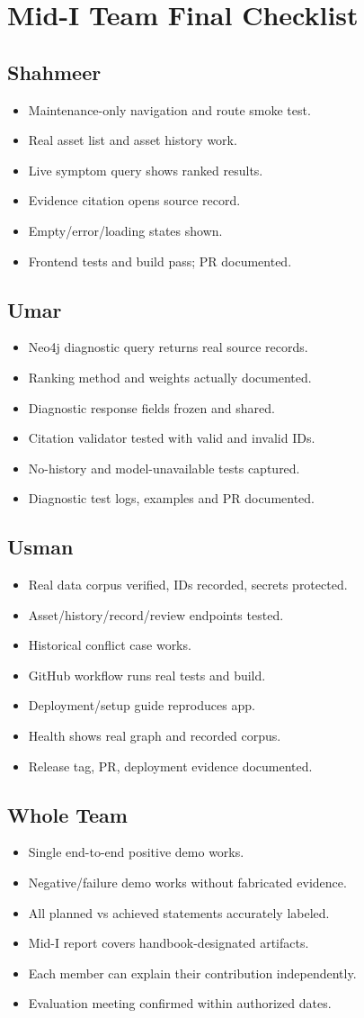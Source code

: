 \documentclass[11pt,a4paper,oneside]{report}
\newcommand{\task}[1]{\item[$\square$] #1}
\begin{document}
\appendix
\chapter{Mid-I Team Final Checklist}
\section{Shahmeer}
\begin{itemize}
\task{Maintenance-only navigation and route smoke test.}
\task{Real asset list and asset history work.}
\task{Live symptom query shows ranked results.}
\task{Evidence citation opens source record.}
\task{Empty/error/loading states shown.}
\task{Frontend tests and build pass; PR documented.}
\end{itemize}
\section{Umar}
\begin{itemize}
\task{Neo4j diagnostic query returns real source records.}
\task{Ranking method and weights actually documented.}
\task{Diagnostic response fields frozen and shared.}
\task{Citation validator tested with valid and invalid IDs.}
\task{No-history and model-unavailable tests captured.}
\task{Diagnostic test logs, examples and PR documented.}
\end{itemize}
\section{Usman}
\begin{itemize}
\task{Real data corpus verified, IDs recorded, secrets protected.}
\task{Asset/history/record/review endpoints tested.}
\task{Historical conflict case works.}
\task{GitHub workflow runs real tests and build.}
\task{Deployment/setup guide reproduces app.}
\task{Health shows real graph and recorded corpus.}
\task{Release tag, PR, deployment evidence documented.}
\end{itemize}
\section{Whole Team}
\begin{itemize}
\task{Single end-to-end positive demo works.}
\task{Negative/failure demo works without fabricated evidence.}
\task{All planned vs achieved statements accurately labeled.}
\task{Mid-I report covers handbook-designated artifacts.}
\task{Each member can explain their contribution independently.}
\task{Evaluation meeting confirmed within authorized dates.}
\end{itemize}
\end{document}

